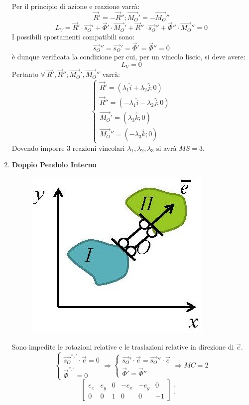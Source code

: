 \documentclass{article}
\begin{document}
\begin{adjustwidth}{2in}{}
\begin{enumerate}
Per il principio di azione e reazione varrà:
\[
\vec{R}' = -\vec{R}''; \vec{M_O}' = -\vec{M_O}''
\]
\[
L_V = \vec{R}' \cdot \vec{s_O}'+ \vec{\Phi}' \cdot \vec{M_O}'+ \vec{R}'' \cdot \vec{s_O}''+ \vec{\Phi}'' \cdot \vec{M_O}'' = 0 
\]
I possibili spostamenti compatibili sono: 
\[
\vec{s_O}'' = \vec{s_O}' = \vec{\Phi}' = \vec{\Phi}'' = 0
\]
è dunque verificata la condizione per cui, per un vincolo liscio, si deve avere:
\[
L_V = 0
\]
Pertanto $ \forall ~ \vec{R}', \vec{R}''; \vec{M_O}', \vec{M_O}''$ varrà:
\[
\begin{cases}
\vec{R}' = (\lambda_1 \hat{i} + \lambda_2 \hat{j}; 0) \\
\vec{R}'' = (-\lambda_1 \hat{i} - \lambda_2 \hat{j}; 0)\\
\vec{M_O}' = (\lambda_3\hat{k}; 0) \\
\vec{M_O}'' = (-\lambda_3\hat{k}; 0)
\end{cases}
\]				
Dovendo imporre 3 reazioni vincolari $\lambda_1, \lambda_2, \lambda_3$ si avrà $MS = 3$. \newline	
\newpage			
\item \textbf{Doppio Pendolo Interno} \newline	
	\begin{figure}[H]
	\centering
	\includegraphics[width=0.25\linewidth]{immagini/1.PARTE2_Pagina_11}
\end{figure}			
Sono impedite le rotazioni relative e le traslazioni relative in direzione di $\vec{e}$.
\[
\begin{cases}
	\vec{s_O}^{'', '} \cdot \vec{e} = 0 \\
	\vec{\Phi}^{'', '} = 0
\end{cases} \Rightarrow \begin{cases}
	\vec{s_O}' \cdot \vec{e} = \vec{s_O}'' \cdot \vec{e} \\
	\vec{\Phi}' = \vec{\Phi}''
\end{cases} \Rightarrow MC = 2
\]				
\[
\left[ \begin{array}{cccccc}
	e_x & e_y & 0 & -e_x & -e_y & 0 \\
	0 & 0 & 1 & 0 & 0 & -1 	
\end{array}\right] \left[ \begin{array}{c}

\end{array}\]
\end{enumerate}
\end{adjustwidth}
\end{document}
